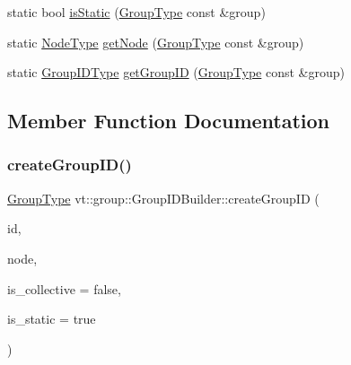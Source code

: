 \begin{DoxyCompactItemize}
\item 
static bool \hyperlink{structvt_1_1group_1_1_group_i_d_builder_a7f8f671d1716de3777a4c2b05d1426a2}{is\+Static} (\hyperlink{namespacevt_a27b5e4411c9b6140c49100e050e2f743}{Group\+Type} const \&group)
\item 
static \hyperlink{namespacevt_a866da9d0efc19c0a1ce79e9e492f47e2}{Node\+Type} \hyperlink{structvt_1_1group_1_1_group_i_d_builder_ab8b73ad8570726c27ce2cebeb14872c9}{get\+Node} (\hyperlink{namespacevt_a27b5e4411c9b6140c49100e050e2f743}{Group\+Type} const \&group)
\item 
static \hyperlink{namespacevt_1_1group_a805a6643787ae841525c371fd0cefeb3}{Group\+I\+D\+Type} \hyperlink{structvt_1_1group_1_1_group_i_d_builder_a9e20ea794b9042cd4dc533084ce3800e}{get\+Group\+ID} (\hyperlink{namespacevt_a27b5e4411c9b6140c49100e050e2f743}{Group\+Type} const \&group)
\end{DoxyCompactItemize}


\subsection{Member Function Documentation}
\mbox{\label{structvt_1_1group_1_1_group_i_d_builder_aea5ed64876ed495000fe0bf7e86549cf}} 
\subsubsection{\texorpdfstring{create\+Group\+I\+D()}{createGroupID()}}
{\footnotesize\ttfamily \hyperlink{namespacevt_a27b5e4411c9b6140c49100e050e2f743}{Group\+Type} vt\+::group\+::\+Group\+I\+D\+Builder\+::create\+Group\+ID (\begin{DoxyParamCaption}\item[{\hyperlink{namespacevt_1_1group_a805a6643787ae841525c371fd0cefeb3}{Group\+I\+D\+Type} const \&}]{id,  }\item[{\hyperlink{namespacevt_a866da9d0efc19c0a1ce79e9e492f47e2}{Node\+Type} const \&}]{node,  }\item[{bool const \&}]{is\+\_\+collective = {\ttfamily false},  }\item[{bool const \&}]{is\+\_\+static = {\ttfamily true} }\end{DoxyParamCaption})\hspace{0.3cm}{\ttfamily [static]}}

